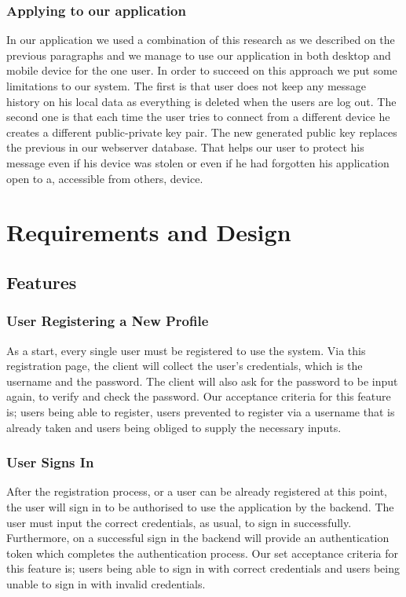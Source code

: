 \documentclass[11pt,a4paper]{report}
\begin{document}
\subsection{Applying to our application}
In our application we used a combination of this research as we described on the previous paragraphs and we manage to use our application in both desktop and mobile device for the one user. In order to succeed on this approach we put some limitations to our system. The first is that user does not keep any message history on his local data as everything is deleted when the users are log out. The second one is that each time the user tries to connect from a different device he creates a different public-private key pair. The new generated public key replaces the previous in our webserver database. That helps our user to protect his message even if his device was stolen or even if he had forgotten his application open to a, accessible from others, device.

\chapter{Requirements and Design}

\section{Features}
\subsection{User Registering a New Profile}
As a start, every single user must be registered to use the system. Via this registration page, the client will collect the user’s credentials, which is the username and the password. The client will also ask for the password to be input again, to verify and check the password. Our acceptance criteria for this feature is; users being able to register, users prevented to register via a username that is already taken and users being obliged to supply the necessary inputs.
\subsection{User Signs In}
After the registration process, or a user can be already registered at this point, the user will sign in to be authorised to use the application by the backend. The user must input the correct credentials, as usual, to sign in successfully. Furthermore, on a successful sign in the backend will provide an authentication token which completes the authentication process. Our set acceptance criteria for this feature is; users being able to sign in with correct credentials and users being unable to sign in with invalid credentials.
\end{document}
